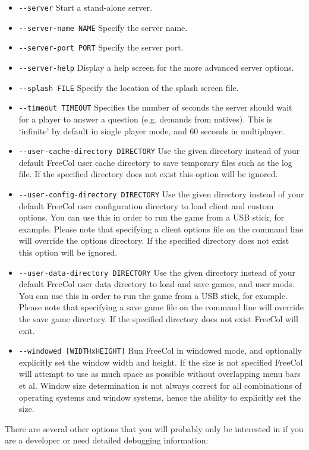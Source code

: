 \documentclass[12pt]{book}
\begin{document}
\begin{itemize}
\item\verb$--server$ Start a stand-alone server.
\item\verb$--server-name NAME$ Specify the server name.
\item\verb$--server-port PORT$ Specify the server port.
\item\verb$--server-help$ Display a help screen for the more advanced
  server options.
\item\verb$--splash FILE$ Specify the location of the splash screen file.
\item\verb$--timeout TIMEOUT$ Specifies the number of seconds the
  server should wait for a player to answer a question (e.g. demands
  from natives). This is `infinite' by default in single player mode,
  and 60 seconds in multiplayer.
\item\verb$--user-cache-directory DIRECTORY$ Use the given directory
  instead of your default FreeCol user cache directory to save
  temporary files such as the log file. If the specified directory does not
  exist this option will be ignored.
\item\verb$--user-config-directory DIRECTORY$ Use the given directory
  instead of your default FreeCol user configuration directory to load
  client and custom options. You can use this in order to run the
  game from a USB stick, for example. Please note
  that specifying a client options file on the command line will override
  the options directory. If the specified directory does not
  exist this option will be ignored.
\item\verb$--user-data-directory DIRECTORY$ Use the given directory
  instead of your default FreeCol user data directory to load and save
  games, and user mods. You can use this in order to run the
  game from a USB stick, for example. Please note
  that specifying a save game file on the command line will override
  the save game directory. If the specified directory does not
  exist FreeCol will exit.
\item\verb$--windowed [WIDTHxHEIGHT]$ Run FreeCol in windowed mode,
  and optionally explicitly set the window width and height. If the
  size is not specified FreeCol will attempt to use as much space as
  possible without overlapping menu bars et al. Window size
  determination is not always correct for all combinations of
  operating systems and window systems, hence the ability to
  explicitly set the size.
\end{itemize}

There are several other options that you will probably only be
interested in if you are a developer or need detailed debugging
information:
\end{document}
